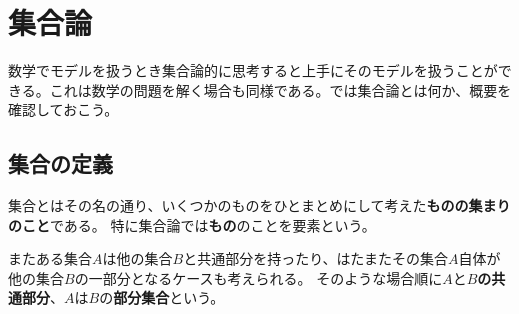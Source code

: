 \documentclass[a4j, 9pt]{ltjsarticle}
\def\ds{\displaystyle}
\begin{document}
  \newpage

  \section{集合論}
    数学でモデルを扱うとき集合論的に思考すると上手にそのモデルを扱うことができる。これは数学の問題を解く場合も同様である。では集合論とは何か、概要を確認しておこう。

    \subsection{集合の定義}
      集合とはその名の通り、いくつかのものをひとまとめにして考えた\textbf{ものの集まりのこと}である。
      特に集合論では\textbf{もの}のことを要素という。\par
      またある集合$\ds A$は他の集合$\ds B$と共通部分を持ったり、はたまたその集合$\ds A$自体が他の集合$\ds B$の一部分となるケースも考えられる。
      そのような場合順に\textbf{$\ds AとB$の共通部分}、\textbf{$\ds AはBの$部分集合}という。
\end{document}
